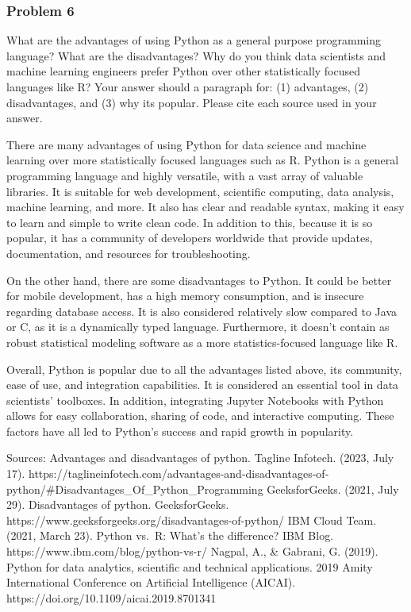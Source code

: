 \documentclass[11pt]{article}
\begin{document}
    \hypertarget{problem-6}{%
\subsubsection{Problem 6}\label{problem-6}}

What are the advantages of using Python as a general purpose programming
language? What are the disadvantages? Why do you think data scientists
and machine learning engineers prefer Python over other statistically
focused languages like R? Your answer should a paragraph for: (1)
advantages, (2) disadvantages, and (3) why its popular. Please cite each
source used in your answer.

    

    There are many advantages of using Python for data science and machine
learning over more statistically focused languages such as R. Python is
a general programming language and highly versatile, with a vast array
of valuable libraries. It is suitable for web development, scientific
computing, data analysis, machine learning, and more. It also has clear
and readable syntax, making it easy to learn and simple to write clean
code. In addition to this, because it is so popular, it has a community
of developers worldwide that provide updates, documentation, and
resources for troubleshooting.

On the other hand, there are some disadvantages to Python. It could be
better for mobile development, has a high memory consumption, and is
insecure regarding database access. It is also considered relatively
slow compared to Java or C, as it is a dynamically typed language.
Furthermore, it doesn't contain as robust statistical modeling software
as a more statistics-focused language like R.

Overall, Python is popular due to all the advantages listed above, its
community, ease of use, and integration capabilities. It is considered
an essential tool in data scientists' toolboxes. In addition,
integrating Jupyter Notebooks with Python allows for easy collaboration,
sharing of code, and interactive computing. These factors have all led
to Python's success and rapid growth in popularity.

Sources: Advantages and disadvantages of python. Tagline Infotech.
(2023, July 17).
https://taglineinfotech.com/advantages-and-disadvantages-of-python/\#Disadvantages\_Of\_Python\_Programming
GeeksforGeeks. (2021, July 29). Disadvantages of python. GeeksforGeeks.
https://www.geeksforgeeks.org/disadvantages-of-python/ IBM Cloud Team.
(2021, March 23). Python vs.~R: What's the difference? IBM Blog.
https://www.ibm.com/blog/python-vs-r/ Nagpal, A., \& Gabrani, G. (2019).
Python for data analytics, scientific and technical applications. 2019
Amity International Conference on Artificial Intelligence (AICAI).
https://doi.org/10.1109/aicai.2019.8701341


    
    
    
\end{document}

